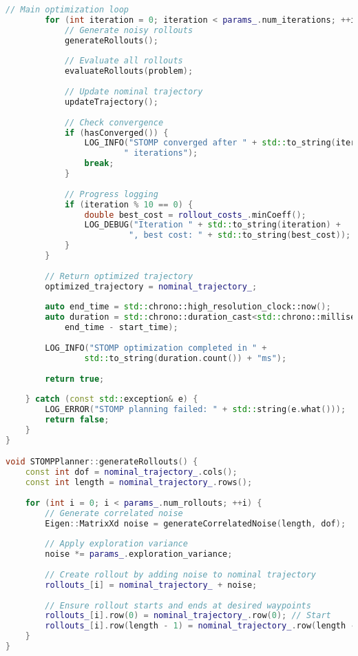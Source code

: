 \begin{lstlisting}[language=C++, caption={STOMP Path Planning Algorithm}, label={lst:app-stomp}]
        // Main optimization loop
        for (int iteration = 0; iteration < params_.num_iterations; ++iteration) {
            // Generate noisy rollouts
            generateRollouts();
            
            // Evaluate all rollouts
            evaluateRollouts(problem);
            
            // Update nominal trajectory
            updateTrajectory();
            
            // Check convergence
            if (hasConverged()) {
                LOG_INFO("STOMP converged after " + std::to_string(iteration) + 
                        " iterations");
                break;
            }
            
            // Progress logging
            if (iteration % 10 == 0) {
                double best_cost = rollout_costs_.minCoeff();
                LOG_DEBUG("Iteration " + std::to_string(iteration) + 
                         ", best cost: " + std::to_string(best_cost));
            }
        }
        
        // Return optimized trajectory
        optimized_trajectory = nominal_trajectory_;
        
        auto end_time = std::chrono::high_resolution_clock::now();
        auto duration = std::chrono::duration_cast<std::chrono::milliseconds>(
            end_time - start_time);
        
        LOG_INFO("STOMP optimization completed in " + 
                std::to_string(duration.count()) + "ms");
        
        return true;
        
    } catch (const std::exception& e) {
        LOG_ERROR("STOMP planning failed: " + std::string(e.what()));
        return false;
    }
}

void STOMPPlanner::generateRollouts() {
    const int dof = nominal_trajectory_.cols();
    const int length = nominal_trajectory_.rows();
    
    for (int i = 0; i < params_.num_rollouts; ++i) {
        // Generate correlated noise
        Eigen::MatrixXd noise = generateCorrelatedNoise(length, dof);
        
        // Apply exploration variance
        noise *= params_.exploration_variance;
        
        // Create rollout by adding noise to nominal trajectory
        rollouts_[i] = nominal_trajectory_ + noise;
        
        // Ensure rollout starts and ends at desired waypoints
        rollouts_[i].row(0) = nominal_trajectory_.row(0); // Start
        rollouts_[i].row(length - 1) = nominal_trajectory_.row(length - 1); // Goal
    }
}


\end{lstlisting}
